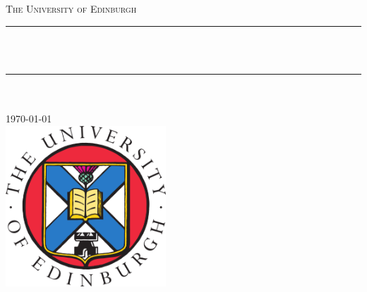 \documentclass[12pt, a4paper, oneside]{Thesis}
\title{\ttitle}
\begin{document}
\frontmatter %
\fancyhead{} %
\rhead{\thepage} %
\lhead{} %
\pagestyle{fancy}
\newcommand{\HRule}{\rule{\linewidth}{0.5mm}} %





\begin{titlepage}
\begin{center}

\textsc{\LARGE The University of Edinburgh}\\[1.5cm]
\HRule \\[0.4cm] %

\textsc{\huge \bfseries \thesistitle }\\[0.4cm]
\HRule \\[0.5cm] %
\textsc{\Large \deptname}\\[0.5cm]

\large \today \\[1cm]

\includegraphics[width=6cm]{logo}
\vfill
\end{center}

\end{titlepage}



\end{document}
